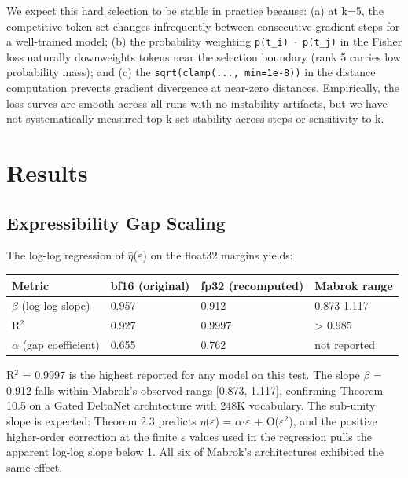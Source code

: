 \documentclass[
  11pt,
]{article}
\begin{document}
We expect this hard selection to be stable in practice because: (a) at
k=5, the competitive token set changes infrequently between consecutive
gradient steps for a well-trained model; (b) the probability weighting
\texttt{p(t\_i)\ $\cdot$\ p(t\_j)} in the Fisher loss naturally downweights
tokens near the selection boundary (rank 5 carries low probability
mass); and (c) the \texttt{sqrt(clamp(...,\ min=1e-8))} in the distance
computation prevents gradient divergence at near-zero distances.
Empirically, the loss curves are smooth across all runs with no
instability artifacts, but we have not systematically measured top-k set
stability across steps or sensitivity to k.

\hypertarget{results}{%
\section{Results}\label{results}}

\hypertarget{expressibility-gap-scaling}{%
\subsection{Expressibility Gap
Scaling}\label{expressibility-gap-scaling}}

The log-log regression of $\hat{\eta}$($\varepsilon$) on the float32 margins yields:

\begin{longtable}[]{@{}llll@{}}
\toprule\noalign{}
Metric & bf16 (original) & fp32 (recomputed) & Mabrok range \\
\midrule\noalign{}
\endhead
\bottomrule\noalign{}
\endlastfoot
$\beta$ (log-log slope) & 0.957 & 0.912 & 0.873-1.117 \\
R$^2$ & 0.927 & 0.9997 & \textgreater{} 0.985 \\
$\alpha$ (gap coefficient) & 0.655 & 0.762 & not reported \\
\end{longtable}

R$^2$ = 0.9997 is the highest reported for any model on this test. The
slope $\beta$ = 0.912 falls within Mabrok's observed range {[}0.873, 1.117{]},
confirming Theorem 10.5 on a Gated DeltaNet architecture with 248K
vocabulary. The sub-unity slope is expected: Theorem 2.3 predicts $\eta$($\varepsilon$) =
$\alpha$$\cdot$$\varepsilon$ + O($\varepsilon$$^2$), and the positive higher-order correction at the finite $\varepsilon$
values used in the regression pulls the apparent log-log slope below 1.
All six of Mabrok's architectures exhibited the same effect.
\end{document}
